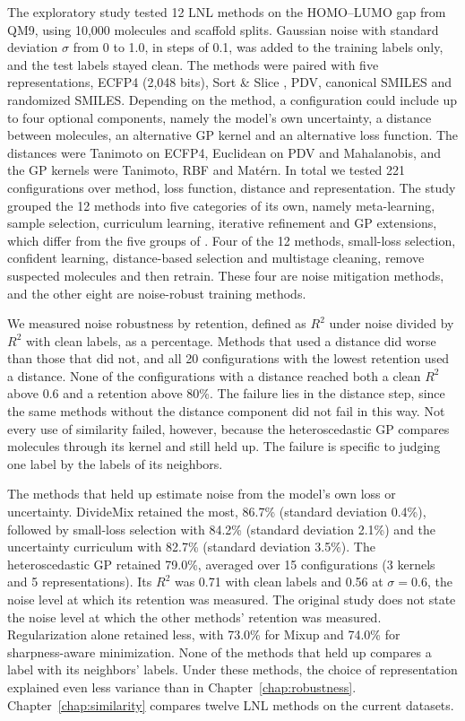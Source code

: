 The exploratory study tested 12 LNL methods on the HOMO--LUMO gap from QM9, using 10,000 molecules and scaffold splits. Gaussian noise with standard deviation $\sigma$ from 0 to 1.0, in steps of 0.1, was added to the training labels only, and the test labels stayed clean. The methods were paired with five representations, ECFP4 (2,048 bits), Sort \& Slice \citep{Dablander2024}, PDV, canonical SMILES and randomized SMILES. Depending on the method, a configuration could include up to four optional components, namely the model's own uncertainty, a distance between molecules, an alternative GP kernel and an alternative loss function. The distances were Tanimoto on ECFP4, Euclidean on PDV and Mahalanobis, and the GP kernels were Tanimoto, RBF and Mat\'{e}rn. In total we tested 221 configurations over method, loss function, distance and representation. The study grouped the 12 methods into five categories of its own, namely meta-learning, sample selection, curriculum learning, iterative refinement and GP extensions, which differ from the five groups of \citet{Song2022}. Four of the 12 methods, small-loss selection, confident learning, distance-based selection and multistage cleaning, remove suspected molecules and then retrain. These four are noise mitigation methods, and the other eight are noise-robust training methods.

We measured noise robustness by retention, defined as $R^2$ under noise divided by $R^2$ with clean labels, as a percentage. Methods that used a distance did worse than those that did not, and all 20 configurations with the lowest retention used a distance. None of the configurations with a distance reached both a clean $R^2$ above 0.6 and a retention above 80\%. The failure lies in the distance step, since the same methods without the distance component did not fail in this way. Not every use of similarity failed, however, because the heteroscedastic GP compares molecules through its kernel and still held up. The failure is specific to judging one label by the labels of its neighbors.

The methods that held up estimate noise from the model's own loss or uncertainty. DivideMix \citep{li2020dividemix} retained the most, 86.7\% (standard deviation 0.4\%), followed by small-loss selection \citep{Han2018} with 84.2\% (standard deviation 2.1\%) and the uncertainty curriculum \citep{Bengio2009} with 82.7\% (standard deviation 3.5\%). The heteroscedastic GP \citep{liu2020} retained 79.0\%, averaged over 15 configurations (3 kernels and 5 representations). Its $R^2$ was 0.71 with clean labels and 0.56 at $\sigma = 0.6$, the noise level at which its retention was measured. The original study does not state the noise level at which the other methods' retention was measured. Regularization alone retained less, with 73.0\% for Mixup and 74.0\% for sharpness-aware minimization. None of the methods that held up compares a label with its neighbors' labels. Under these methods, the choice of representation explained even less variance than in Chapter~\ref{chap:robustness}. Chapter~\ref{chap:similarity} compares twelve LNL methods on the current datasets.

